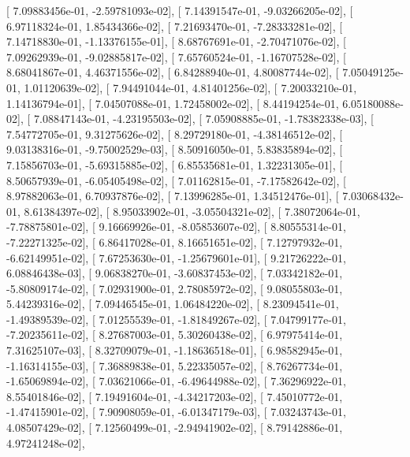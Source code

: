 \documentclass{article}
\begin{document}
       [  7.09883456e-01,  -2.59781093e-02],
       [  7.14391547e-01,  -9.03266205e-02],
       [  6.97118324e-01,   1.85434366e-02],
       [  7.21693470e-01,  -7.28333281e-02],
       [  7.14718830e-01,  -1.13376155e-01],
       [  8.68767691e-01,  -2.70471076e-02],
       [  7.09262939e-01,  -9.02885817e-02],
       [  7.65760524e-01,  -1.16707528e-02],
       [  8.68041867e-01,   4.46371556e-02],
       [  6.84288940e-01,   4.80087744e-02],
       [  7.05049125e-01,   1.01120639e-02],
       [  7.94491044e-01,   4.81401256e-02],
       [  7.20033210e-01,   1.14136794e-01],
       [  7.04507088e-01,   1.72458002e-02],
       [  8.44194254e-01,   6.05180088e-02],
       [  7.08847143e-01,  -4.23195503e-02],
       [  7.05908885e-01,  -1.78382338e-03],
       [  7.54772705e-01,   9.31275626e-02],
       [  8.29729180e-01,  -4.38146512e-02],
       [  9.03138316e-01,  -9.75002529e-03],
       [  8.50916050e-01,   5.83835894e-02],
       [  7.15856703e-01,  -5.69315885e-02],
       [  6.85535681e-01,   1.32231305e-01],
       [  8.50657939e-01,  -6.05405498e-02],
       [  7.01162815e-01,  -7.17582642e-02],
       [  8.97882063e-01,   6.70937876e-02],
       [  7.13996285e-01,   1.34512476e-01],
       [  7.03068432e-01,   8.61384397e-02],
       [  8.95033902e-01,  -3.05504321e-02],
       [  7.38072064e-01,  -7.78875801e-02],
       [  9.16669926e-01,  -8.05853607e-02],
       [  8.80555314e-01,  -7.22271325e-02],
       [  6.86417028e-01,   8.16651651e-02],
       [  7.12797932e-01,  -6.62149951e-02],
       [  7.67253630e-01,  -1.25679601e-01],
       [  9.21726222e-01,   6.08846438e-03],
       [  9.06838270e-01,  -3.60837453e-02],
       [  7.03342182e-01,  -5.80809174e-02],
       [  7.02931900e-01,   2.78085972e-02],
       [  9.08055803e-01,   5.44239316e-02],
       [  7.09446545e-01,   1.06484220e-02],
       [  8.23094541e-01,  -1.49389539e-02],
       [  7.01255539e-01,  -1.81849267e-02],
       [  7.04799177e-01,  -7.20235611e-02],
       [  8.27687003e-01,   5.30260438e-02],
       [  6.97975414e-01,   7.31625107e-03],
       [  8.32709079e-01,  -1.18636518e-01],
       [  6.98582945e-01,  -1.16314155e-03],
       [  7.36889838e-01,   5.22335057e-02],
       [  8.76267734e-01,  -1.65069894e-02],
       [  7.03621066e-01,  -6.49644988e-02],
       [  7.36296922e-01,   8.55401846e-02],
       [  7.19491604e-01,  -4.34217203e-02],
       [  7.45010772e-01,  -1.47415901e-02],
       [  7.90908059e-01,  -6.01347179e-03],
       [  7.03243743e-01,   4.08507429e-02],
       [  7.12560499e-01,  -2.94941902e-02],
       [  8.79142886e-01,   4.97241248e-02],
\end{document}
